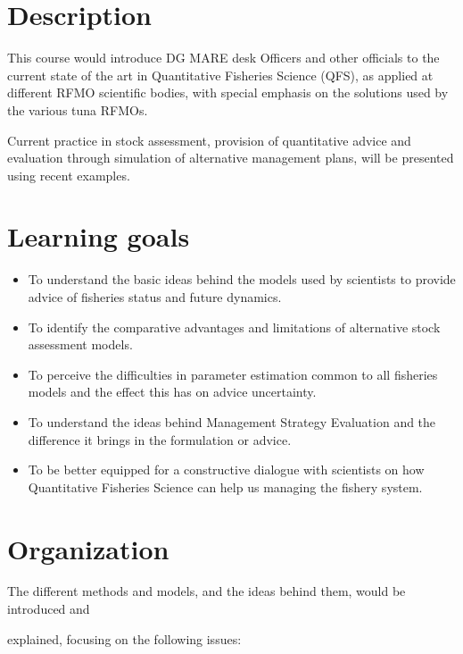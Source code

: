 \documentclass[a4paper,10pt]{article}
\title{}
\author{}
\date{}
\begin{document}
\maketitle

\section*{Description}

This course would introduce DG MARE desk Officers and other officials to the current state of the art in Quantitative Fisheries Science (QFS), as applied at different RFMO scientific bodies, with special emphasis on the solutions used by the various tuna RFMOs.

Current practice in stock assessment, provision of quantitative advice and evaluation through simulation of alternative management plans, will be presented using recent examples.

\section*{Learning goals}

\begin{itemize}
 \item To understand the basic ideas behind the models used by scientists to provide advice of fisheries status and future dynamics.
 \item To identify the comparative advantages and limitations of alternative stock assessment models.
 \item To perceive the difficulties in parameter estimation common to all fisheries models and the effect this has on advice uncertainty.
 \item To understand the ideas behind Management Strategy Evaluation and the difference it brings in the formulation or advice.
 \item To be better equipped for a constructive dialogue with scientists on how Quantitative Fisheries Science can help us managing the fishery system.
\end{itemize}

\section*{Organization}

The different methods and models, and the ideas behind them, would be introduced and

explained, focusing on the following issues:
\end{document}
